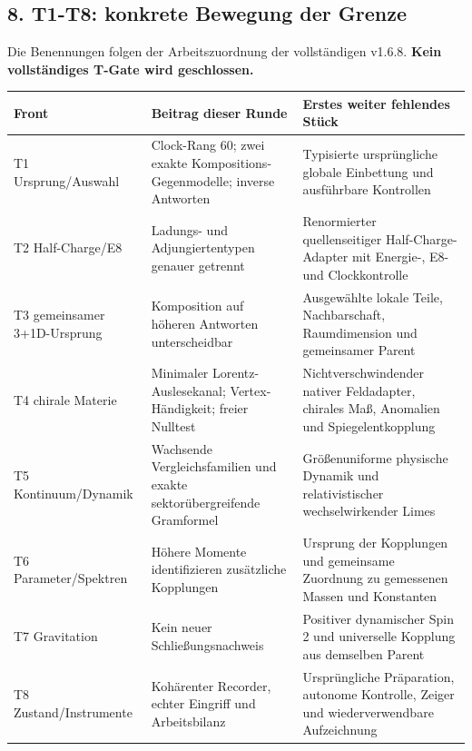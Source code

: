 \subsection{8. T1-T8: konkrete Bewegung der
Grenze}\label{t1-t8-konkrete-bewegung-der-grenze}

Die Benennungen folgen der Arbeitszuordnung der vollständigen v1.6.8.
\textbf{Kein vollständiges T-Gate wird geschlossen.}

{\def\LTcaptype{none} %
\begin{longtable}[]{@{}
  >{\raggedright\arraybackslash}p{}
  >{\raggedright\arraybackslash}p{}
  >{\raggedright\arraybackslash}p{}@{}}
\toprule\noalign{}
\begin{minipage}[b]{\linewidth}\raggedright
Front
\end{minipage} & \begin{minipage}[b]{\linewidth}\raggedright
Beitrag dieser Runde
\end{minipage} & \begin{minipage}[b]{\linewidth}\raggedright
Erstes weiter fehlendes Stück
\end{minipage} \\
\midrule\noalign{}
\endhead
\bottomrule\noalign{}
\endlastfoot
T1 Ursprung/Auswahl & Clock-Rang 60; zwei exakte
Kompositions-Gegenmodelle; inverse Antworten & Typisierte ursprüngliche
globale Einbettung und ausführbare Kontrollen \\
T2 Half-Charge/E8 & Ladungs- und Adjungiertentypen genauer getrennt &
Renormierter quellenseitiger Half-Charge-Adapter mit Energie-, E8- und
Clockkontrolle \\
T3 gemeinsamer 3+1D-Ursprung & Komposition auf höheren Antworten
unterscheidbar & Ausgewählte lokale Teile, Nachbarschaft, Raumdimension
und gemeinsamer Parent \\
T4 chirale Materie & Minimaler Lorentz-Auslesekanal; Vertex-Händigkeit;
freier Nulltest & Nichtverschwindender nativer Feldadapter, chirales
Maß, Anomalien und Spiegelentkopplung \\
T5 Kontinuum/Dynamik & Wachsende Vergleichsfamilien und exakte
sektorübergreifende Gramformel & Größenuniforme physische Dynamik und
relativistischer wechselwirkender Limes \\
T6 Parameter/Spektren & Höhere Momente identifizieren zusätzliche
Kopplungen & Ursprung der Kopplungen und gemeinsame Zuordnung zu
gemessenen Massen und Konstanten \\
T7 Gravitation & Kein neuer Schließungsnachweis & Positiver dynamischer
Spin 2 und universelle Kopplung aus demselben Parent \\
T8 Zustand/Instrumente & Kohärenter Recorder, echter Eingriff und
Arbeitsbilanz & Ursprüngliche Präparation, autonome Kontrolle, Zeiger
und wiederverwendbare Aufzeichnung \\
\end{longtable}
}

